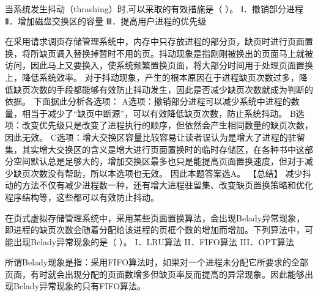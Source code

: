 \question 当系统发生抖动（thrashing）时,可以采取的有效措施是（ ）。
Ⅰ．撤销部分进程 Ⅱ．增加磁盘交换区的容量 Ⅲ．提高用户进程的优先级
\par{}
\begin{solution}在采用请求调页存储管理系统中，内存中只存放进程的部分页，缺页时进行页面置换，将所缺页调入替换掉暂时不用的页。抖动现象是指刚刚被换出的页面马上就被访问，因此马上又要换入，使系统频繁置换页面，将大部分时间用于处理页面置换上，降低系统效率。
对于抖动现象，产生的根本原因在于进程缺页次数过多，降低缺页次数的手段都能够有效防止抖动发生，因此是否减少缺页次数就成为判断的依据。
下面据此分析各选项：
A选项：撤销部分进程可以减少系统中进程的数量，相当于减少了``缺页中断源''，可以有效降低缺页次数，防止系统抖动。
B选项：改变优先级只是改变了进程执行的顺序，但依然会产生相同数量的缺页次数，因此无效。
C选项：增大交换区容量比较容易让读者误认为是增大了进程的驻留集，其实增大交换区的含义是增大进行页面置换时的临时存储区，在各种书中这部分空间默认总是足够大的，增加交换区最多也只是能提高页面置换速度，但对于减少缺页次数没有帮助，所以本选项也无效。
因此本题答案选A。 【总结】
减少抖动的方法不仅有减少进程数一种，还有增大进程驻留集、改变缺页置换策略和优化程序结构等，这些都可以有效防止抖动。
\end{solution}
\question 在页式虚拟存储管理系统中，采用某些页面置换算法，会出现Belady异常现象，即进程的缺页次数会随着分配给该进程的页框个数的增加而增加。下列算法中，可能出现Belady异常现象的是（
）。 I．LRU算法 II．FIFO算法 III．OPT算法
\par{}
\begin{solution}所谓Belady现象是指：采用FIFO算法时，如果对一个进程未分配它所要求的全部页面，有时就会出现分配的页面数增多但缺页率反而提高的异常现象。因此能够出现Belady异常现象的只有FIFO算法。
\end{solution}
